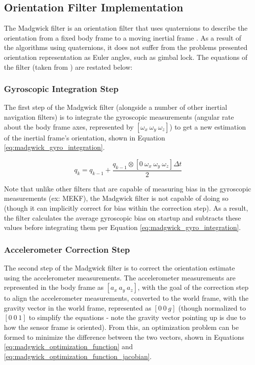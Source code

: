 \documentclass[bare_jrnl_transmag]{subfiles}
\begin{document}
\subsection{Orientation Filter Implementation}
The Madgwick filter is an orientation filter that uses quaternions to describe the orientation from a fixed body frame to a moving inertial frame \cite{ahrs_madgwick}. As a result of the algorithms using quaternions, it does not suffer from the problems presented orientation representation as Euler angles, such as gimbal lock. The equations of the filter (taken from \cite{ahrs_madgwick}) are restated below:

\subsubsection{Gyroscopic Integration Step}
The first step of the Madgwick filter (alongside a number of other inertial navigation filters) is to integrate the gyroscopic measurements (angular rate about the body frame axes, represented by $[\omega_x \ \omega_y \ \omega_z]$) to get a new estimation of the inertial frame's orientation, shown in Equation \ref{eq:madgwick_gyro_integration}.

\begin{equation}
    q_{k} = q_{k-1} + \frac{q_{k-1} \otimes [0 \ \omega_x \ \omega_y \ \omega_z] \Delta t}{2}
    \label{eq:madgwick_gyro_integration}
\end{equation}

Note that unlike other filters that are capable of measuring bias in the gyroscopic measurements (ex: MEKF), the Madgwick filter is not capable of doing so (though it can implicitly correct for bias within the correction step). As a result, the filter calculates the average gyroscopic bias on startup and subtracts these values before integrating them per Equation \ref{eq:madgwick_gyro_integration}.

\subsubsection{Accelerometer Correction Step}
The second step of the Madgwick filter is to correct the orientation estimate using the accelerometer measurements. The accelerometer measurements are represented in the body frame as $[a_x \ a_y \ a_z]$, with the goal of the correction step to align the accelerometer measurements, converted to the world frame, with the gravity vector in the world frame, represented as $[0 \ 0 \ g]$ (though normalized to $[0 \ 0 \ 1]$ to simplify the equations - note the gravity vector pointing up is due to how the sensor frame is oriented). From this, an optimization problem can be formed to minimize the difference between the two vectors, shown in Equations \ref{eq:madgwick_optimization_function} and \ref{eq:madgwick_optimization_function_jacobian}.
\end{document}
